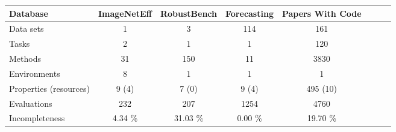 
    \begin{tabular}{lccccccc}
        \toprule 
        Database & ImageNetEff & RobustBench & Forecasting & Papers With Code \\
        \midrule
        Data sets & 1 & 3 & 114 & 161 \\
        Tasks & 2 & 1 & 1 & 120 \\
        Methods & 31 & 150 & 11 & 3830 \\
        Environments & 8 & 1 & 1 & 1 \\
        Properties (resources) & 9 (4) & 7 (0) & 9 (4) & 495 (10) \\
        Evaluations & 232 & 207 & 1254 & 4760 \\
        Incompleteness &  4.34 \% & 31.03 \% &  0.00 \% & 19.70 \% \\
        \bottomrule
    \end{tabular}
